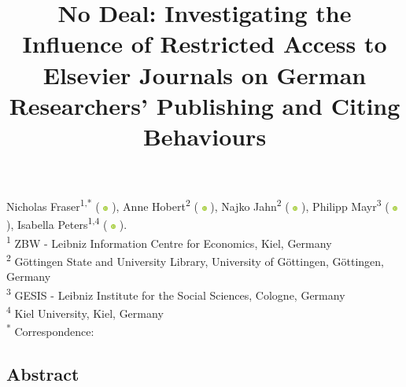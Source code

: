 \documentclass[
]{article}
\title{\vspace{-2em}No Deal: Investigating the Influence of Restricted Access to Elsevier Journals on German Researchers' Publishing and Citing Behaviours\vspace{-3em}}
\date{}
\begin{document}
\maketitle

\newcommand{\orcid}{%
  \begingroup\normalfont
  \includegraphics[height=6px]{./assets/orcid_logo.png}%
  \endgroup
}
Nicholas Fraser\textsuperscript{1,*} (\orcid{} \href{https://orcid.org/0000-0002-7582-6339}{\color{black}{0000-0002-7582-6339}}), Anne Hobert\textsuperscript{2} (\orcid{} \href{https://orcid.org/0000-0003-2429-2995}{\color{black}{0000-0003-2429-2995}}), Najko Jahn\textsuperscript{2} (\orcid{} \href{https://orcid.org/0000-0001-5105-1463}{\color{black}{0000-0001-5105-1463}}), Philipp Mayr\textsuperscript{3} (\orcid{} \href{https://orcid.org/0000-0002-6656-1658}{\color{black}{0000-0002-6656-1658}}), Isabella Peters\textsuperscript{1,4} (\orcid{} \href{https://orcid.org/0000-0001-5840-0806}{\color{black}{0000-0001-5840-0806}}). \\

\textsuperscript{1} ZBW - Leibniz Information Centre for Economics, Kiel, Germany \\
\textsuperscript{2} Göttingen State and University Library, University of Göttingen, Göttingen, Germany \\
\textsuperscript{3} GESIS - Leibniz Institute for the Social Sciences, Cologne, Germany \\
\textsuperscript{4} Kiel University, Kiel, Germany \\

\textsuperscript{*} Correspondence: \href{mailto:n.fraser@zbw.eu}{\color{black}{n.fraser@zbw.eu}} 

\hypertarget{abstract}{%
\subsection{Abstract}\label{abstract}}
\end{document}
